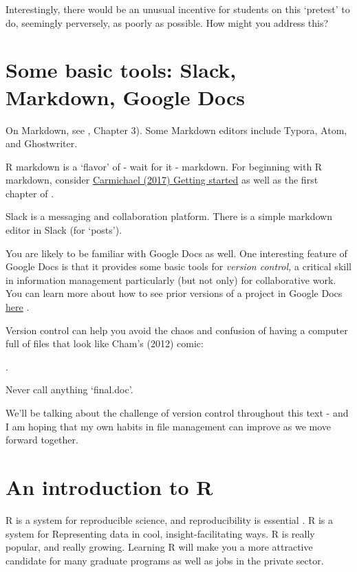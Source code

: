 \documentclass[]{book}
\theoremstyle{definition}
\theoremstyle{definition}
\theoremstyle{definition}
\theoremstyle{remark}
\begin{document}
Interestingly, there would be an unusual incentive for students on this
`pretest' to do, seemingly perversely, as poorly as possible. How might
you address this?

\chapter{Some basic tools: Slack, Markdown, Google
Docs}\label{some-basic-tools-slack-markdown-google-docs}

On Markdown, see \citet{freeman2017informatics}, Chapter 3). Some
Markdown editors include Typora, Atom, and Ghostwriter.

R markdown is a `flavor' of - wait for it - markdown. For beginning with
R markdown, consider
\href{https://idc9.github.io/stor390/notes/getting_started/getting_started.html}{Carmichael
(2017) Getting started} as well as the first chapter of
\citet{wickham2016r}.

Slack is a messaging and collaboration platform. There is a simple
markdown editor in Slack (for `posts').

You are likely to be familiar with Google Docs as well. One interesting
feature of Google Docs is that it provides some basic tools for
\emph{version control,} a critical skill in information management
particularly (but not only) for collaborative work. You can learn more
about how to see prior versions of a project in Google Docs
\href{https://sites.google.com/site/scriptsexamples/home/announcements/named-versions-new-version-history-google-docs}{here}
.

Version control can help you avoid the chaos and confusion of having a
computer full of files that look like Cham's (2012) comic:

.

Never call anything `final.doc'.

We'll be talking about the challenge of version control throughout this
text - and I am hoping that my own habits in file management can improve
as we move forward together.

\chapter{An introduction to R}\label{an-introduction-to-r}

R is a system for reproducible science, and reproducibility is essential
\citep{baumer2014r}. R is a system for Representing data in cool,
insight-facilitating ways. R is really popular, and really growing.
Learning R will make you a more attractive candidate for many graduate
programs as well as jobs in the private sector.
\end{document}
